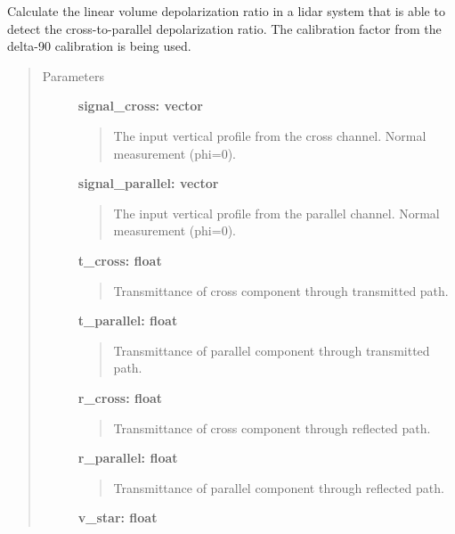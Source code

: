\documentclass[letterpaper,10pt,english]{sphinxmanual}
\begin{document}

\begin{fulllineitems}
\label{depolarization:depolarization.volume_depolarization_cross_parallel}
Calculate the linear volume depolarization ratio in a lidar system that is
able to detect the cross-to-parallel depolarization ratio.
The calibration factor from the delta-90 calibration is being used.
\begin{quote}\begin{description}
\item[{Parameters}] \leavevmode
\textbf{signal\_cross: vector}
\begin{quote}

The input vertical profile from the cross channel. Normal measurement (phi=0).
\end{quote}

\textbf{signal\_parallel: vector}
\begin{quote}

The input vertical profile from the parallel channel. Normal measurement (phi=0).
\end{quote}

\textbf{t\_cross: float}
\begin{quote}

Transmittance of cross component through transmitted path.
\end{quote}

\textbf{t\_parallel: float}
\begin{quote}

Transmittance of parallel component through transmitted path.
\end{quote}

\textbf{r\_cross: float}
\begin{quote}

Transmittance of cross component through reflected path.
\end{quote}

\textbf{r\_parallel: float}
\begin{quote}

Transmittance of parallel component through reflected path.
\end{quote}

\textbf{v\_star: float}
\begin{quote}


\end{quote}
\end{description}
\end{quote}
\end{fulllineitems}
\end{document}
